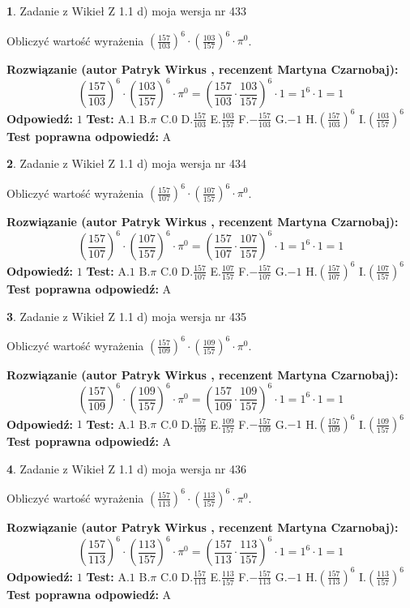 \documentclass[12pt, a4paper]{article}
\theoremstyle{definition} %
\newtheorem{zad}{}
\newcommand{\zadStart}[1]{\begin{zad}#1\newline}
\newcommand{\zadStop}{\end{zad}}
\newcommand{\rozwStart}[2]{\noindent \textbf{Rozwiązanie (autor #1 , recenzent #2): }\newline}
\newcommand{\rozwStop}{\newline}
\newcommand{\odpStart}{\noindent \textbf{Odpowiedź:}\newline}
\newcommand{\odpStop}{\newline}
\newcommand{\testStart}{\noindent \textbf{Test:}\newline}
\newcommand{\testStop}{\newline}
\newcommand{\kluczStart}{\noindent \textbf{Test poprawna odpowiedź:}\newline}
\newcommand{\kluczStop}{\newline}
\begin{document}
\zadStart{Zadanie z Wikieł Z 1.1 d) moja wersja nr 433}

Obliczyć wartość wyrażenia $(\frac{157}{103})^{6} \cdot (\frac{103}{157})^{6} \cdot \pi^{0}$.
\zadStop
\rozwStart{Patryk Wirkus}{Martyna Czarnobaj}
$$(\frac{157}{103})^{6} \cdot (\frac{103}{157})^{6} \cdot \pi^{0} = (\frac{157}{103} \cdot \frac{103}{157})^{6} \cdot 1 = 1^{6} \cdot 1 = 1$$
\rozwStop
\odpStart
$1$
\odpStop
\testStart
A.$1$ B.$\pi$ C.$0$ D.$\frac{157}{103}$ E.$\frac{103}{157}$
F.$-\frac{157}{103}$ G.$-1$
H.$(\frac{157}{103})^{6}$
I.$(\frac{103}{157})^{6}$
\testStop
\kluczStart
A
\kluczStop



\zadStart{Zadanie z Wikieł Z 1.1 d) moja wersja nr 434}

Obliczyć wartość wyrażenia $(\frac{157}{107})^{6} \cdot (\frac{107}{157})^{6} \cdot \pi^{0}$.
\zadStop
\rozwStart{Patryk Wirkus}{Martyna Czarnobaj}
$$(\frac{157}{107})^{6} \cdot (\frac{107}{157})^{6} \cdot \pi^{0} = (\frac{157}{107} \cdot \frac{107}{157})^{6} \cdot 1 = 1^{6} \cdot 1 = 1$$
\rozwStop
\odpStart
$1$
\odpStop
\testStart
A.$1$ B.$\pi$ C.$0$ D.$\frac{157}{107}$ E.$\frac{107}{157}$
F.$-\frac{157}{107}$ G.$-1$
H.$(\frac{157}{107})^{6}$
I.$(\frac{107}{157})^{6}$
\testStop
\kluczStart
A
\kluczStop



\zadStart{Zadanie z Wikieł Z 1.1 d) moja wersja nr 435}

Obliczyć wartość wyrażenia $(\frac{157}{109})^{6} \cdot (\frac{109}{157})^{6} \cdot \pi^{0}$.
\zadStop
\rozwStart{Patryk Wirkus}{Martyna Czarnobaj}
$$(\frac{157}{109})^{6} \cdot (\frac{109}{157})^{6} \cdot \pi^{0} = (\frac{157}{109} \cdot \frac{109}{157})^{6} \cdot 1 = 1^{6} \cdot 1 = 1$$
\rozwStop
\odpStart
$1$
\odpStop
\testStart
A.$1$ B.$\pi$ C.$0$ D.$\frac{157}{109}$ E.$\frac{109}{157}$
F.$-\frac{157}{109}$ G.$-1$
H.$(\frac{157}{109})^{6}$
I.$(\frac{109}{157})^{6}$
\testStop
\kluczStart
A
\kluczStop



\zadStart{Zadanie z Wikieł Z 1.1 d) moja wersja nr 436}

Obliczyć wartość wyrażenia $(\frac{157}{113})^{6} \cdot (\frac{113}{157})^{6} \cdot \pi^{0}$.
\zadStop
\rozwStart{Patryk Wirkus}{Martyna Czarnobaj}
$$(\frac{157}{113})^{6} \cdot (\frac{113}{157})^{6} \cdot \pi^{0} = (\frac{157}{113} \cdot \frac{113}{157})^{6} \cdot 1 = 1^{6} \cdot 1 = 1$$
\rozwStop
\odpStart
$1$
\odpStop
\testStart
A.$1$ B.$\pi$ C.$0$ D.$\frac{157}{113}$ E.$\frac{113}{157}$
F.$-\frac{157}{113}$ G.$-1$
H.$(\frac{157}{113})^{6}$
I.$(\frac{113}{157})^{6}$
\testStop
\kluczStart
A
\kluczStop
\end{document}

